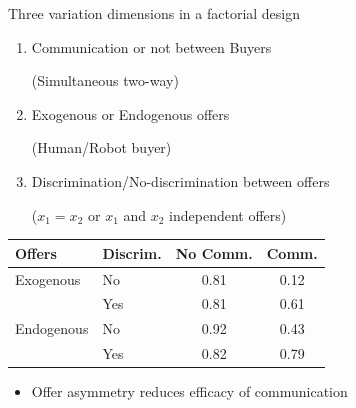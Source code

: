 \documentclass{beamer}
\begin{document}
\begin{frame}
	\begin{card}[Treatments]
	Three variation dimensions in a factorial design
		\begin{enumerate}
			\item Communication or not between Buyers 
			
			(Simultaneous two-way)
			\item Exogenous or Endogenous offers 
			
			(Human/Robot buyer)
			\item Discrimination/No-discrimination between offers 
			
			($x_1=x_2$ or $x_1$ and $x_2$ independent offers)
		\end{enumerate}
	\end{card}
\end{frame}

\begin{frame}
\begin{card}
\begin{tabular}{llcc}\toprule
		\multicolumn{1}{l}{Offers} & \multicolumn{1}{l}{ Discrim.} & \multicolumn{1}{c}{ No Comm.} & \multicolumn{1}{c}{Comm.} \\ \midrule
		Exogenous   & No    &  0.81 & 0.12  \\
		            & Yes   &  0.81 & 0.61  \\
		Endogenous  & No    &  0.92 & 0.43  \\
		            & Yes   &  0.82 & 0.79  \\ \bottomrule
	\end{tabular}
\end{card}
		\pause
\begin{card}
		\begin{itemize}
    		\item Offer asymmetry reduces efficacy of communication
		\end{itemize}
\end{card}
\end{frame}
\end{document}
